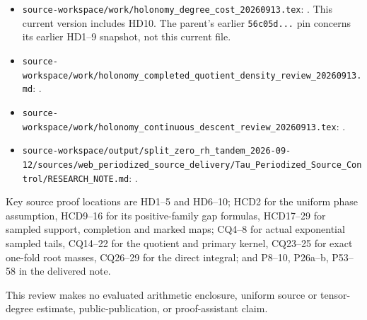 \documentclass{article}
\begin{document}
\begin{itemize}
\tightlist
\item
  \nolinkurl{source-workspace/work/holonomy_degree_cost_20260913.tex}: \texttt{}. This current version includes HD10. The parent's earlier \texttt{56c05d...} pin concerns its earlier HD1--9 snapshot, not this current file.
\item
  \nolinkurl{source-workspace/work/holonomy_completed_quotient_density_review_20260913.md}: \texttt{}.
\item
  \nolinkurl{source-workspace/work/holonomy_continuous_descent_review_20260913.tex}: \texttt{}.
\item
  \nolinkurl{source-workspace/output/split_zero_rh_tandem_2026-09-12/sources/web_periodized_source_delivery/Tau_Periodized_Source_Control/RESEARCH_NOTE.md}: \texttt{}.
\end{itemize}

Key source proof locations are HD1--5 and HD6--10; HCD2 for the uniform phase assumption, HCD9--16 for its positive-family gap formulas, HCD17--29 for sampled support, completion and marked maps; CQ4--8 for actual exponential sampled tails, CQ14--22 for the quotient and primary kernel, CQ23--25 for exact one-fold root masses, CQ26--29 for the direct integral; and P8--10, P26a--b, P53--58 in the delivered note.

This review makes no evaluated arithmetic enclosure, uniform source or tensor-degree estimate, public-publication, or proof-assistant claim.
\end{document}
